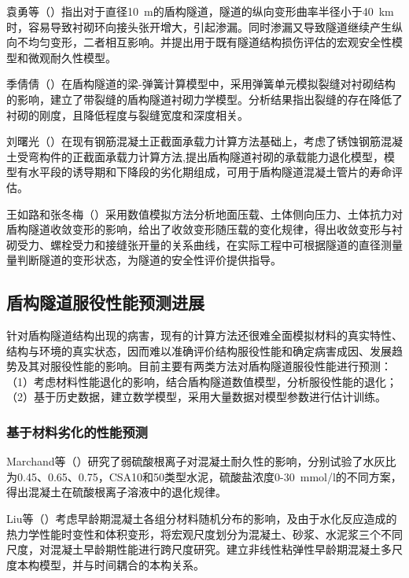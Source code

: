袁勇等（\citeyear{袁勇2006运营越江隧道服役现状调查与检测评估}）指出对于直径10~m的盾构隧道，隧道的纵向变形曲率半径小于40~km时，容易导致衬砌环向接头张开增大，引起渗漏。同时渗漏又导致隧道继续产生纵向不均匀变形，二者相互影响。并提出用于既有隧道结构损伤评估的宏观安全性模型和微观耐久性模型。

季倩倩（\citeyear{季倩倩2009带裂缝的盾构隧道衬砌力学模型研究}）在盾构隧道的梁-弹簧计算模型中，采用弹簧单元模拟裂缝对衬砌结构的影响，建立了带裂缝的盾构隧道衬砌力学模型。分析结果指出裂缝的存在降低了衬砌的刚度，且降低程度与裂缝宽度和深度相关。

刘曙光（\citeyear{刘曙光2012盾构隧道混凝土管片的承载力退化模型}）在现有钢筋混凝土正截面承载力计算方法基础上，考虑了锈蚀钢筋混凝土受弯构件的正截面承载力计算方法,提出盾构隧道衬砌的承载能力退化模型，模型有水平段的诱导期和下降段的劣化期组成，可用于盾构隧道混凝土管片的寿命评估。

王如路和张冬梅（\citeyear{王如路2013超载作用下软土盾构隧道横向变形机理及控制指标研究}）采用数值模拟方法分析地面压载、土体侧向压力、土体抗力对盾构隧道收敛变形的影响，给出了收敛变形随压载的变化规律，得出收敛变形与衬砌受力、螺栓受力和接缝张开量的关系曲线，在实际工程中可根据隧道的直径测量量判断隧道的变形状态，为隧道的安全性评价提供指导。

\subsection{盾构隧道服役性能预测进展}

针对盾构隧道结构出现的病害，现有的计算方法还很难全面模拟材料的真实特性、结构与环境的真实状态，因而难以准确评价结构服役性能和确定病害成因、发展趋势及其对服役性能的影响。目前主要有两类方法对盾构隧道服役性能进行预测：（1）考虑材料性能退化的影响，结合盾构隧道数值模型，分析服役性能的退化；（2）基于历史数据，建立数学模型，采用大量数据对模型参数进行估计训练。

\subsubsection{基于材料劣化的性能预测}

Marchand等（\citeyear{Marchand2002Theoretical}）研究了弱硫酸根离子对混凝土耐久性的影响，分别试验了水灰比为0.45、0.65、0.75，CSA10和50类型水泥，硫酸盐浓度0-30~mmol/l的不同方案，得出混凝土在硫酸根离子溶液中的退化规律。

Liu等（\citeyear{Liu2014A}）考虑早龄期混凝土各组分材料随机分布的影响，及由于水化反应造成的热力学性能时变性和体积变形，将宏观尺度划分为混凝土、砂浆、水泥浆三个不同尺度，对混凝土早龄期性能进行跨尺度研究。建立非线性粘弹性早龄期混凝土多尺度本构模型，并与时间耦合的本构关系。

